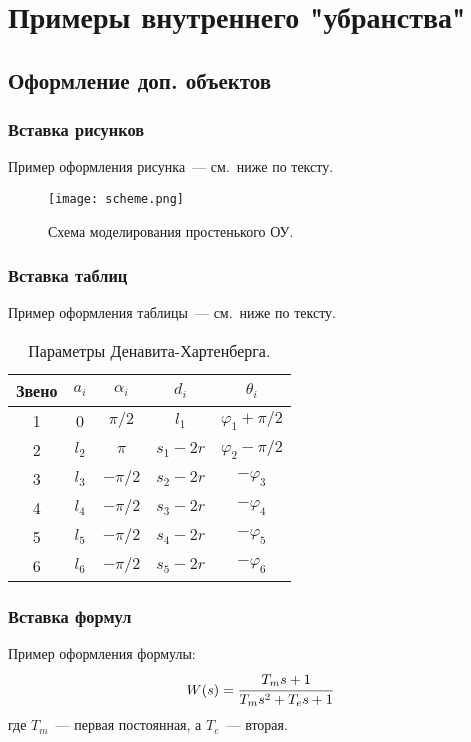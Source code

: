 \section{Примеры внутреннего "убранства"}\label{part_example_of_doc_inside}
\subsection{Оформление доп. объектов}\label{part_pasting_of_extra_objects}
\subsubsection{Вставка рисунков}\label{part_pasting_of_figures}
Пример оформления рисунка~--- см.~ниже по тексту.

\begin{figure}[h]
	\centering
\texttt{[image: scheme.png]}
	\caption{Схема моделирования простенького ОУ.}
	\label{figure_just_example}
\end{figure}


\subsubsection{Вставка таблиц}\label{part_pasting_of_tables}
Пример оформления таблицы~--- см.~ниже по тексту.

\begin{table}[h]
	\caption{Параметры Денавита-Хартенберга.}
	\begin{tabular}{|c|c|c|c|c|}
		\hline
		Звено & $a_i$ & $\alpha_i$ & $d_i$ & $\theta_i$\\
		\hline
		1 & 0 & $\pi/2$ & $l_1$ & $\varphi_1+\pi/2$\\
		\hline
		2  & $l_2$ & $\pi$ & $s_1-2r$ & $\varphi_2-\pi/2$\\
		\hline	
		3 & $l_3$ & $-\pi/2$ & $s_2-2r$ & $-\varphi_3$\\
		\hline
		4 & $l_4$ & $-\pi/2$ & $s_3-2r$ & $-\varphi_4$\\
		\hline
		5 & $l_5$ & $-\pi/2$ & $s_4-2r$ & $-\varphi_5$\\
		\hline
		6 & $l_6$ & $-\pi/2$ & $s_5-2r$ & $-\varphi_6$\\
		\hline
	\end{tabular}
	\label{table_DH_params}
\end{table}


\subsubsection{Вставка формул}\label{part_pasting_of_formulas}
Пример оформления формулы:
\begin{equation}\label{eq_example_of_formula}
	W(s) = \cfrac{T_ms+1}{T_ms^2+T_es+1}
\end{equation}
где $T_m$~--- первая постоянная, а $T_e$~--- вторая.

